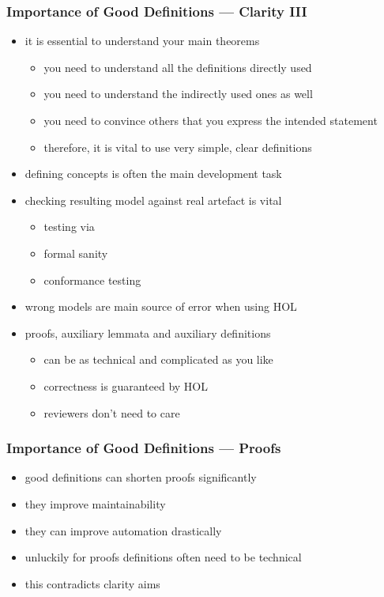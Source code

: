 \begin{frame}
\frametitle{Importance of Good Definitions --- Clarity III}
\begin{itemize}
\item it is essential to understand your main theorems
\begin{itemize}
\item you need to understand all the definitions directly used 
\item you need to understand the indirectly used ones as well
\item you need to convince others that you express the intended statement
\item therefore, it is vital to \alert{use very simple, clear definitions}
\end{itemize}
\item defining concepts is often the main development task
\item checking resulting model against real artefact is vital
\begin{itemize}
\item testing via \eg {}
\item formal sanity
\item conformance testing
\end{itemize}
\item wrong models are main source of error when using HOL
\item proofs, auxiliary lemmata and auxiliary definitions
\begin{itemize}
\item can be as technical and complicated as you like
\item correctness is guaranteed by HOL
\item reviewers don't need to care
\end{itemize}
\end{itemize}
\end{frame}


\begin{frame}
\frametitle{Importance of Good Definitions --- Proofs}
\begin{itemize}
\item good definitions can shorten proofs significantly
\item they improve maintainability
\item they can improve automation drastically
\item unluckily for proofs definitions often need to be technical
\item this contradicts clarity aims
\end{itemize}
\end{frame}


